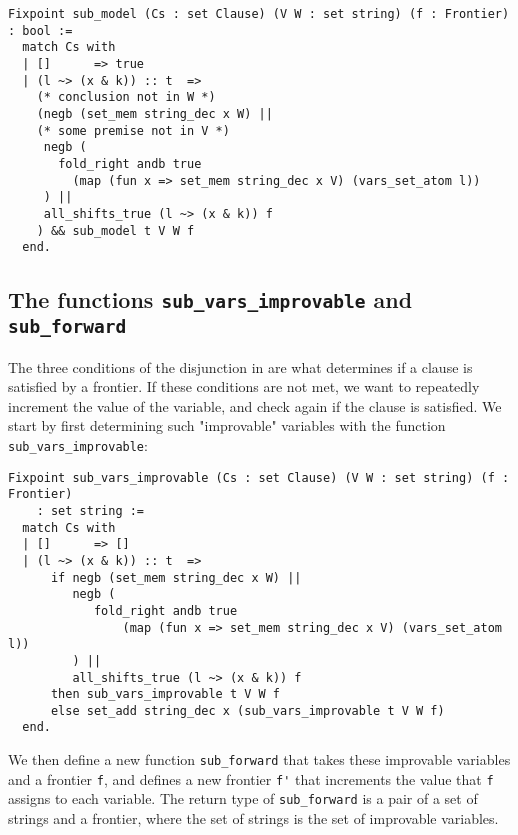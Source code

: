 \begin{minipage}{\linewidth}
\begin{lstlisting}[language=Coq, label={lst:sub_model_def}, caption={The function \lstinline{sub_model} in Coq}]
Fixpoint sub_model (Cs : set Clause) (V W : set string) (f : Frontier) : bool :=
  match Cs with
  | []      => true
  | (l ~> (x & k)) :: t  =>
    (* conclusion not in W *)
    (negb (set_mem string_dec x W) ||
    (* some premise not in V *)
     negb (
       fold_right andb true
         (map (fun x => set_mem string_dec x V) (vars_set_atom l))
     ) ||
     all_shifts_true (l ~> (x & k)) f
    ) && sub_model t V W f
  end.
\end{lstlisting}
\end{minipage}

\subsection{The functions \lstinline{sub_vars_improvable} and \lstinline{sub_forward}}

The three conditions of the disjunction in  are
what determines if a clause is satisfied by a frontier.
If these conditions are not met, we want to repeatedly increment the value of the variable,
and check again if the clause is satisfied.
We start by first determining such "improvable" variables with the function \lstinline{sub_vars_improvable}:

\begin{minipage}{\linewidth}
\begin{lstlisting}[language=Coq, label={lst:sub_vars_improvable_def}, caption={The function \lstinline{sub_vars_improvable}}]
Fixpoint sub_vars_improvable (Cs : set Clause) (V W : set string) (f : Frontier)
    : set string :=
  match Cs with
  | []      => []
  | (l ~> (x & k)) :: t  =>
      if negb (set_mem string_dec x W) ||
         negb (
            fold_right andb true
                (map (fun x => set_mem string_dec x V) (vars_set_atom l))
         ) ||
         all_shifts_true (l ~> (x & k)) f
      then sub_vars_improvable t V W f
      else set_add string_dec x (sub_vars_improvable t V W f)
  end.
\end{lstlisting}
\end{minipage}

We then define a new function \lstinline{sub_forward} that takes these improvable variables
and a frontier \lstinline{f}, and defines a new frontier \lstinline{f'}
that increments the value that \lstinline{f} assigns to each variable.
The return type of \lstinline{sub_forward} is a pair of a set of strings and a frontier,
where the set of strings is the set of improvable variables.

